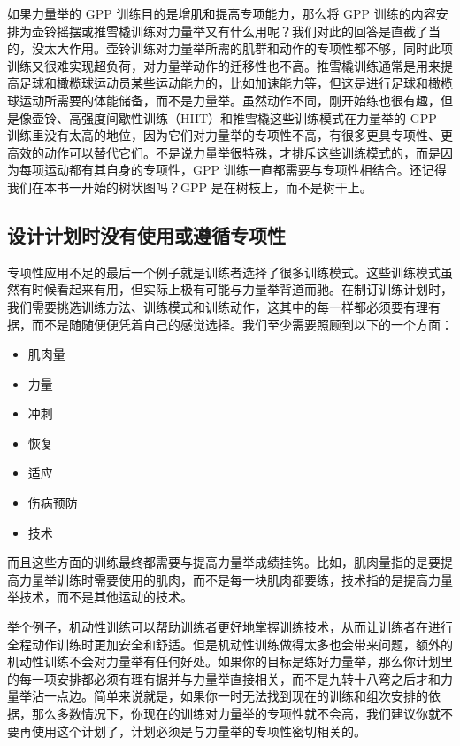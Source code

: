 \documentclass[fontset=fandol, a4paper, 12pt, openright]{ctexbook}
\begin{document}
如果力量举的 GPP 训练目的是增肌和提高专项能力，那么将 GPP 训练的内容安排为壶铃摇摆或推雪橇训练对力量举又有什么用呢？我们对此的回答是直截了当的，没太大作用。壶铃训练对力量举所需的肌群和动作的专项性都不够，同时此项训练又很难实现超负荷，对力量举动作的迁移性也不高。推雪橇训练通常是用来提高足球和橄榄球运动员某些运动能力的，比如加速能力等，但这是进行足球和橄榄球运动所需要的体能储备，而不是力量举。虽然动作不同，刚开始练也很有趣，但是像壶铃、高强度间歇性训练（HIIT）和推雪橇这些训练模式在力量举的 GPP 训练里没有太高的地位，因为它们对力量举的专项性不高，有很多更具专项性、更高效的动作可以替代它们。不是说力量举很特殊，才排斥这些训练模式的，而是因为每项运动都有其自身的专项性，GPP 训练一直都需要与专项性相结合。还记得我们在本书一开始的树状图吗？GPP 是在树枝上，而不是树干上。

\subsection{设计计划时没有使用或遵循专项性}

专项性应用不足的最后一个例子就是训练者选择了很多训练模式。这些训练模式虽然有时候看起来有用，但实际上极有可能与力量举背道而驰。在制订训练计划时，我们需要挑选训练方法、训练模式和训练动作，这其中的每一样都必须要有理有据，而不是随随便便凭着自己的感觉选择。我们至少需要照顾到以下的一个方面：
\begin{itemize}
    \item 肌肉量
    \item 力量
    \item 冲刺
    \item 恢复
    \item 适应
    \item 伤病预防
    \item 技术
\end{itemize}

而且这些方面的训练最终都需要与提高力量举成绩挂钩。比如，肌肉量指的是要提高力量举训练时需要使用的肌肉，而不是每一块肌肉都要练，技术指的是提高力量举技术，而不是其他运动的技术。

举个例子，机动性训练可以帮助训练者更好地掌握训练技术，从而让训练者在进行全程动作训练时更加安全和舒适。但是机动性训练做得太多也会带来问题，额外的机动性训练不会对力量举有任何好处。如果你的目标是练好力量举，那么你计划里的每一项安排都必须有理有据并与力量举直接相关，而不是九转十八弯之后才和力量举沾一点边。简单来说就是，如果你一时无法找到现在的训练和组次安排的依据，那么多数情况下，你现在的训练对力量举的专项性就不会高，我们建议你就不要再使用这个计划了，计划必须是与力量举的专项性密切相关的。
\end{document}
